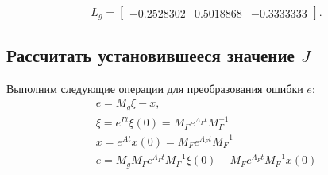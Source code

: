 \begin{equation}
	L_g = 
	\begin{bmatrix}
	  -0.2528302 &  0.5018868 & -0.3333333
	\end{bmatrix}\!\!.
\end{equation}

\subsection{Рассчитать установившееся значение $J$}
Выполним следующие операции для преобразования ошибки $e$:
\begin{gather*}
	e = M_g \xi - x,\\
	\xi = e^{\Gamma t} \xi(0) = M_\Gamma e^{\Lambda_\Gamma t} M_\Gamma^{-1}\\
	x = e^{A t} x(0) = M_F e^{\Lambda_F t} M_F^{-1}\\
	e = M_g M_\Gamma e^{\Lambda_\Gamma t} M_\Gamma^{-1} \xi(0) - M_F e^{\Lambda_F t} M_F^{-1} x(0)
\end{gather*}

